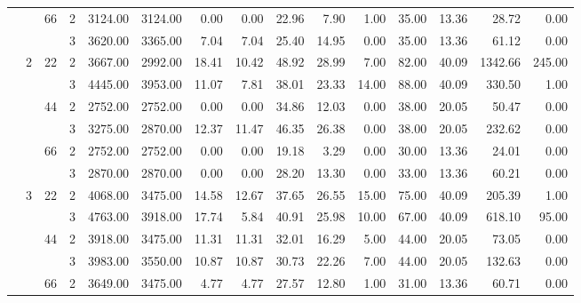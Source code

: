 \begin{tabular}{llllrrrrrrrrrrr}
\cline{3-15}
               &   & \multirow{2}{*}{66} & 2 &  3124.00 &   3124.00 &  0.00 &    0.00 &   22.96 &    7.90 &    1.00 &   35.00 &   13.36 &   28.72 &     0.00 \\
               &   &    & 3 &  3620.00 &   3365.00 &  7.04 &    7.04 &   25.40 &   14.95 &    0.00 &   35.00 &   13.36 &   61.12 &     0.00 \\
\cline{2-15}
\cline{3-15}
               & \multirow{6}{*}{2} & \multirow{2}{*}{22} & 2 &  3667.00 &   2992.00 & 18.41 &   10.42 &   48.92 &   28.99 &    7.00 &   82.00 &   40.09 & 1342.66 &   245.00 \\
               &   &    & 3 &  4445.00 &   3953.00 & 11.07 &    7.81 &   38.01 &   23.33 &   14.00 &   88.00 &   40.09 &  330.50 &     1.00 \\
\cline{3-15}
               &   & \multirow{2}{*}{44} & 2 &  2752.00 &   2752.00 &  0.00 &    0.00 &   34.86 &   12.03 &    0.00 &   38.00 &   20.05 &   50.47 &     0.00 \\
               &   &    & 3 &  3275.00 &   2870.00 & 12.37 &   11.47 &   46.35 &   26.38 &    0.00 &   38.00 &   20.05 &  232.62 &     0.00 \\
\cline{3-15}
               &   & \multirow{2}{*}{66} & 2 &  2752.00 &   2752.00 &  0.00 &    0.00 &   19.18 &    3.29 &    0.00 &   30.00 &   13.36 &   24.01 &     0.00 \\
               &   &    & 3 &  2870.00 &   2870.00 &  0.00 &    0.00 &   28.20 &   13.30 &    0.00 &   33.00 &   13.36 &   60.21 &     0.00 \\
\cline{2-15}
\cline{3-15}
               & \multirow{6}{*}{3} & \multirow{2}{*}{22} & 2 &  4068.00 &   3475.00 & 14.58 &   12.67 &   37.65 &   26.55 &   15.00 &   75.00 &   40.09 &  205.39 &     1.00 \\
               &   &    & 3 &  4763.00 &   3918.00 & 17.74 &    5.84 &   40.91 &   25.98 &   10.00 &   67.00 &   40.09 &  618.10 &    95.00 \\
\cline{3-15}
               &   & \multirow{2}{*}{44} & 2 &  3918.00 &   3475.00 & 11.31 &   11.31 &   32.01 &   16.29 &    5.00 &   44.00 &   20.05 &   73.05 &     0.00 \\
               &   &    & 3 &  3983.00 &   3550.00 & 10.87 &   10.87 &   30.73 &   22.26 &    7.00 &   44.00 &   20.05 &  132.63 &     0.00 \\
\cline{3-15}
               &   & \multirow{2}{*}{66} & 2 &  3649.00 &   3475.00 &  4.77 &    4.77 &   27.57 &   12.80 &    1.00 &   31.00 &   13.36 &   60.71 &     0.00 \\

\end{tabular}
